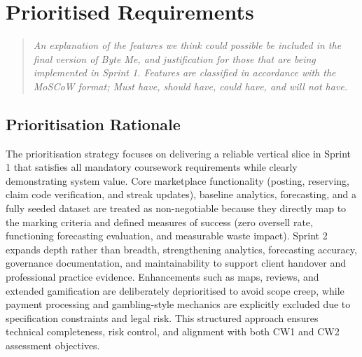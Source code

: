 \documentclass[11pt, a4paper]{report}
\newenvironment{motivation}{\begin{quotation}\noindent\small\itshape}{\end{quotation}}
\begin{document}
\chapter{Prioritised Requirements}
\begin{motivation}
An explanation of the features we think could possible be included in the final version of Byte Me, and justification for those that are being implemented in Sprint 1. Features are classified in accordance with the MoSCoW format; Must have, should have, could have, and will not have.
\end{motivation}
\section{Prioritisation Rationale}
The prioritisation strategy focuses on delivering a reliable vertical slice in Sprint 1 that satisfies all mandatory coursework requirements while clearly demonstrating system value. Core marketplace functionality (posting, reserving, claim code verification, and streak updates), baseline analytics, forecasting, and a fully seeded dataset are treated as non-negotiable because they directly map to the marking criteria and defined measures of success (zero oversell rate, functioning forecasting evaluation, and measurable waste impact). Sprint 2 expands depth rather than breadth, strengthening analytics, forecasting accuracy, governance documentation, and maintainability to support client handover and professional practice evidence. Enhancements such as maps, reviews, and extended gamification are deliberately deprioritised to avoid scope creep, while payment processing and gambling-style mechanics are explicitly excluded due to specification constraints and legal risk. This structured approach ensures technical completeness, risk control, and alignment with both CW1 and CW2 assessment objectives.
\end{document}

